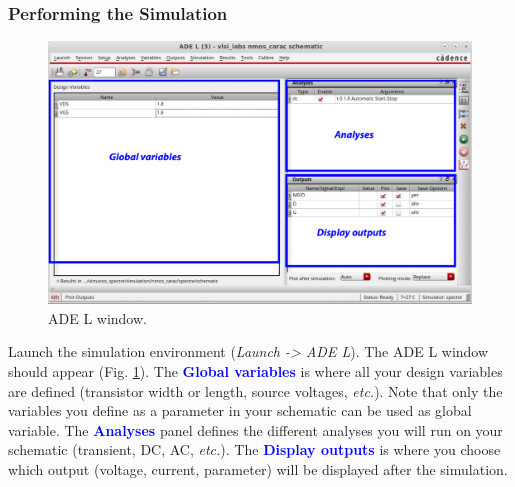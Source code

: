 \subsubsection{Performing the Simulation}
\begin{enumerate}
	\parbox[t]{\dimexpr\textwidth-\leftmargin}{%
		\begin{figure}
			\vspace{-0mm}
			\centering
			\vspace{-\baselineskip}
			\includegraphics[scale=0.3]{figures/lab1_schematic_sim/ADE.pdf}
			\caption{ADE L window.}
			\label{fig_adel}
		\end{figure}
		\item Launch the simulation environment (\textit{Launch -> ADE L}). The ADE L window should appear (Fig. \ref{fig_adel}). The \textbf{\textcolor{blue}{Global variables}} is where all your design variables are defined (transistor width or length, source voltages, \textit{etc.}). Note that only the variables you define as a parameter in your schematic can be used as global variable. The \textbf{\textcolor{blue}{Analyses}} panel defines the different analyses you will run on your schematic (transient, DC, AC, \textit{etc.}). The \textbf{\textcolor{blue}{Display outputs}} is where you choose which output (voltage, current, parameter) will be displayed after the simulation.
		\newline } 
	

\end{enumerate}
